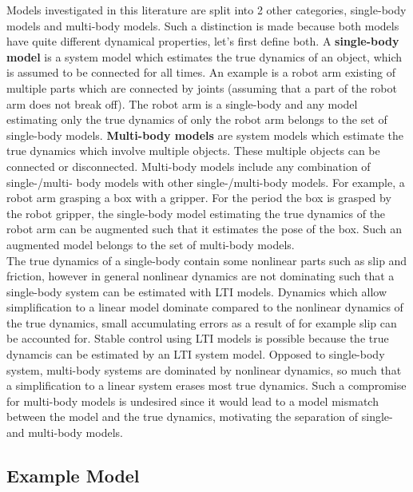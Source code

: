 Models investigated in this literature are split into 2 other categories, single-body models and multi-body models. Such a distinction is made because both models have quite different dynamical properties, let's first define both. A \textbf{single-body model} is a system model which estimates the true dynamics of an object, which is assumed to be connected for all times. An example is a robot arm existing of multiple parts which are connected by joints (assuming that a part of the robot arm does not break off). The robot arm is a single-body and any model estimating only the true dynamics of only the robot arm belongs to the set of single-body models. \textbf{Multi-body models} are system models which estimate the true dynamics which involve multiple objects. These multiple objects can be connected or disconnected. Multi-body models include any combination of single-/multi- body models with other single-/multi-body models. For example, a robot arm grasping a box with a gripper. For the period the box is grasped by the robot gripper, the single-body model estimating the true dynamics of the robot arm can be augmented such that it estimates the pose of the box. Such an augmented model belongs to the set of multi-body models.\\

The true dynamics of a single-body contain some nonlinear parts such as slip and friction, however in general nonlinear dynamics are not dominating such that a single-body system can be estimated with \ac{LTI} models. Dynamics which allow simplification to a linear model dominate compared to the nonlinear dynamics of the true dynamics, small accumulating errors as a result of for example slip can be accounted for. Stable control using \ac{LTI} models is possible because the true dynamcis can be estimated by an \ac{LTI} system model. Opposed to single-body system, multi-body systems are dominated by nonlinear dynamics, so much that a simplification to a linear system erases most true dynamics. Such a compromise for multi-body models is undesired since it would lead to a model mismatch between the model and the true dynamics, motivating the separation of single- and multi-body models.

\subsection{Example Model}


